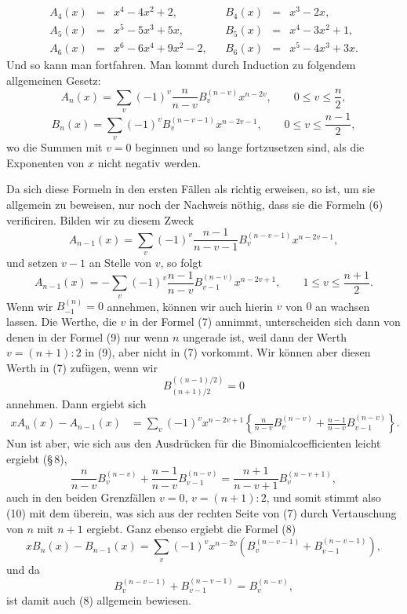 \documentclass[11pt]{article}
\begin{document}
\[
\begin{array}{rclcrcl}
A_4(x)&=&x^4-4x^2+2,     && B_4(x)&=&x^3-2x,\\
A_5(x)&=&x^5-5x^3+5x,   && B_5(x)&=&x^4-3x^2+1,\\
A_6(x)&=&x^6-6x^4+9x^2-2, && B_6(x)&=&x^5-4x^3+3x.
\end{array}
\]
Und so kann man fortfahren. Man kommt durch Induction zu folgendem allgemeinen Gesetz:
\[
\tag{7}        A_n(x)=\sum_v(-1)^v\frac{n}{n-v}B_v^{(n-v)}x^{n-2v},
        \qquad 0\le v\le \frac n2,
\]
\[
\tag{8}        B_n(x)=\sum_v(-1)^vB_v^{(n-v-1)}x^{n-2v-1},
        \qquad 0\le v\le\frac{n-1}{2},
\]
wo die Summen mit $v=0$ beginnen und so lange fortzusetzen sind, als die Exponenten von $x$ nicht negativ werden.

Da sich diese Formeln in den ersten Fällen als richtig erweisen, so ist, um sie allgemein zu beweisen, nur noch der Nachweis nöthig, dass sie die Formeln (6) verificiren. Bilden wir zu diesem Zweck
\[
        A_{n-1}(x)=\sum_v(-1)^v\frac{n-1}{n-v-1}B_v^{(n-v-1)}x^{n-2v-1},
\]
und setzen $v-1$ an Stelle von $v$, so folgt
\[
\tag{9}        A_{n-1}(x)=-\sum_v(-1)^v\frac{n-1}{n-v}B_{v-1}^{(n-v)}x^{n-2v+1},
        \qquad 1\le v\le\frac{n+1}{2}.
\]
Wenn wir $B_{-1}^{(n)}=0$ annehmen, können wir auch hierin $v$ von $0$ an wachsen lassen. Die Werthe, die $v$ in der Formel (7) annimmt, unterscheiden sich dann von denen in der Formel (9) nur wenn $n$ ungerade ist, weil dann der Werth $v=(n+1):2$ in (9), aber nicht in (7) vorkommt. Wir können aber diesen Werth in (7) zufügen, wenn wir
\[
        B_{(n+1)/2}^{((n-1)/2)}=0
\]
annehmen. Dann ergiebt sich
\[
\tag{10}\begin{aligned}
xA_n(x)-A_{n-1}(x)
&=\sum_v(-1)^v x^{n-2v+1}\left\{
\frac{n}{n-v}B_v^{(n-v)}+\frac{n-1}{n-v}B_{v-1}^{(n-v)}\right\}.
\end{aligned}
\]
Nun ist aber, wie sich aus den Ausdrücken für die Binomialcoefficienten leicht ergiebt (\S\,8),
\[
        \frac{n}{n-v}B_v^{(n-v)}+\frac{n-1}{n-v}B_{v-1}^{(n-v)}
        =\frac{n+1}{n-v+1}B_v^{(n-v+1)},
\]
auch in den beiden Grenzfällen $v=0$, $v=(n+1):2$, und somit stimmt also (10) mit dem überein, was sich aus der rechten Seite von (7) durch Vertauschung von $n$ mit $n+1$ ergiebt. Ganz ebenso ergiebt die Formel (8)
\[
        xB_n(x)-B_{n-1}(x)=\sum_v(-1)^v x^{n-2v}\left(B_v^{(n-v-1)}+B_{v-1}^{(n-v-1)}\right),
\]
und da
\[
        B_v^{(n-v-1)}+B_{v-1}^{(n-v-1)}=B_v^{(n-v)},
\]
ist damit auch (8) allgemein bewiesen.
\end{document}
